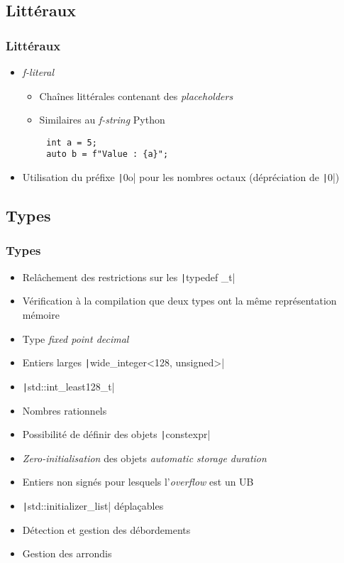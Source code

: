 \documentclass[C++.tex]{subfiles}
\begin{document}
\subsection*{Littéraux}
\begin{frame}[fragile]
	\frametitle{Littéraux}
	\begin{itemize}
		\item \textit{f-literal}
		\begin{itemize}
			\item Chaînes littérales contenant des \textit{placeholders}
			\item Similaires au \textit{f-string} Python
		\end{itemize}
	\end{itemize}

	\begin{verbatim}
		int a = 5;
		auto b = f"Value : {a}";
	\end{verbatim}

	\begin{itemize}
		\item Utilisation du préfixe \texttt|0o| pour les nombres octaux (dépréciation de \texttt|0|)
	\end{itemize}

\end{frame}

\subsection*{Types}
\begin{frame}[fragile]
	\frametitle{Types}
	\begin{itemize}
		\item Relâchement des restrictions sur les \texttt|typedef _t|
		\item Vérification à la compilation que deux types ont la même représentation mémoire
		\item Type \textit{fixed point decimal}
		\item Entiers larges \texttt|wide_integer<128, unsigned>|
		\item \texttt|std::int_least128_t|
		\item Nombres rationnels
		\item Possibilité de définir des objets \texttt|constexpr|
		\item \textit{Zero-initialisation} des objets \textit{automatic storage duration}
		\item Entiers non signés pour lesquels l'\textit{overflow} est un UB
		\item \texttt|std::initializer_list| déplaçables
		\item Détection et gestion des débordements
		\item Gestion des arrondis
	\end{itemize}

\end{frame}
\end{document}
